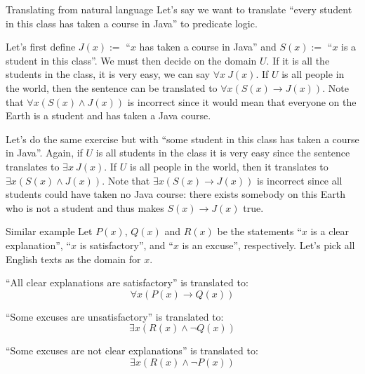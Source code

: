 \documentclass{article}
\begin{document}
\begin{parag}{Translating from natural language}
    Let's say we want to translate ``every student in this class has taken a course in Java'' to predicate logic.

    Let's first define $J\left(x\right) := $ ``$x$ has taken a course in Java'' and $S\left(x\right) := $ ``$x$ is a student in this class''. We must then decide on the domain $U$. If it is all the students in the class, it is very easy, we can say $\forall x\ J\left(x\right)$. If $U$ is all people in the world, then the sentence can be translated to $\forall x\left(S\left(x\right) \to J\left(x\right)\right)$. Note that $\forall x\left(S\left(x\right) \land J\left(x\right)\right)$ is incorrect since it would mean that everyone on the Earth is a student and has taken a Java course.

    \vspace{1em}

    Let's do the same exercise but with ``some student in this class has taken a course in Java''. Again, if $U$ is all students in the class it is very easy since the sentence translates to $\exists x\ J\left(x\right)$. If $U$ is all people in the world, then it translates to $\exists x\left(S\left(x\right) \land J\left(x\right)\right)$. Note that $\exists x\left(S\left(x\right) \to J\left(x\right)\right)$ is incorrect since all students could have taken no Java course: there exists somebody on this Earth who is not a student and thus makes $S\left(x\right) \to J\left(x\right)$ true.
\end{parag}

\begin{parag}{Similar example}
    Let $P\left(x\right)$, $Q\left(x\right)$ and $R\left(x\right)$ be the statements ``$x$ is a clear explanation'', ``$x$ is satisfactory'', and ``$x$ is an excuse'', respectively. Let's pick all English texts as the domain for $x$.

    ``All clear explanations are satisfactory'' is translated to: 
    \[\forall x\left(P\left(x\right) \to Q\left(x\right)\right)\]
    
    ``Some excuses are unsatisfactory'' is translated to: 
    \[\exists x\left(R\left(x\right) \land \lnot Q\left(x\right)\right)\]
    
    ``Some excuses are not clear explanations'' is translated to: 
    \[\exists x\left(R\left(x\right) \land \lnot P\left(x\right)\right)\]
\end{parag}
\end{document}

